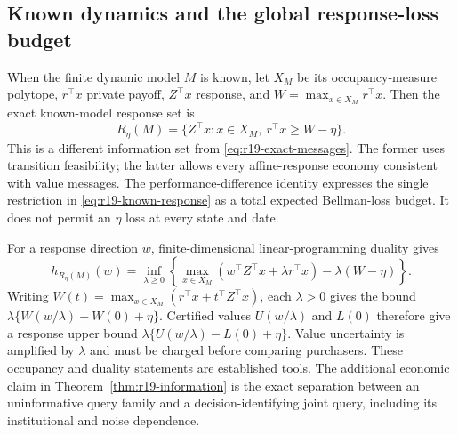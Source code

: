 \subsection{Known dynamics and the global response-loss budget}
When the finite dynamic model $M$ is known, let $X_M$ be its occupancy-measure polytope, $r^\top x$ private payoff, $Z^\top x$ response, and $W=\max_{x\in X_M}r^\top x$. Then the exact known-model response set is
\begin{equation}
 R_\eta(M)=\{Z^\top x:x\in X_M,\ r^\top x\geq W-\eta\}.
 \label{eq:r19-known-response}
\end{equation}
This is a different information set from \eqref{eq:r19-exact-messages}. The former uses transition feasibility; the latter allows every affine-response economy consistent with value messages. The performance-difference identity expresses the single restriction in \eqref{eq:r19-known-response} as a total expected Bellman-loss budget. It does not permit an $\eta$ loss at every state and date.

For a response direction $w$, finite-dimensional linear-programming duality gives
\begin{equation}
 h_{R_\eta(M)}(w)=\inf_{\lambda\geq0}\left\{\max_{x\in X_M}(w^\top Z^\top x+\lambda r^\top x)-\lambda(W-\eta)\right\}.
 \label{eq:r19-directed-dual}
\end{equation}
Writing $W(t)=\max_{x\in X_M}(r^\top x+t^\top Z^\top x)$, each $\lambda>0$ gives the bound $\lambda\{W(w/\lambda)-W(0)+\eta\}$. Certified values $U(w/\lambda)$ and $L(0)$ therefore give a response upper bound $\lambda\{U(w/\lambda)-L(0)+\eta\}$. Value uncertainty is amplified by $\lambda$ and must be charged before comparing purchasers. These occupancy and duality statements are established tools. The additional economic claim in Theorem~\ref{thm:r19-information} is the exact separation between an uninformative query family and a decision-identifying joint query, including its institutional and noise dependence.
